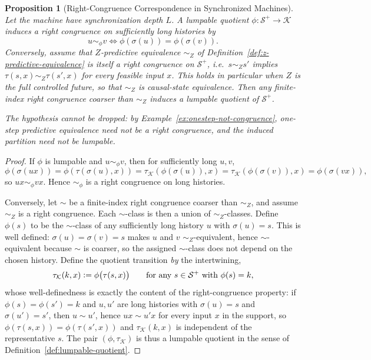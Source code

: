 \documentclass[12pt]{article}
\newtheorem{proposition}[theorem]{Proposition}
\theoremstyle{definition}
\newcommand{\eqdef}{\vcentcolon=}
\newcommand{\Splus}{\mathcal S^{+}}
\begin{document}
\begin{proposition}[Right-Congruence Correspondence in Synchronized Machines]
\label{prop:lumpability}
Let the machine have synchronization depth $L$.  A lumpable quotient
$\phi:\Splus\to\mathcal K$ induces a right congruence on sufficiently long
histories by
\[
u\sim_\phi v
\iff
\phi(\sigma(u))=\phi(\sigma(v)).
\]
Conversely, assume that $Z$-predictive equivalence $\sim_Z$ of
Definition~\ref{def:z-predictive-equivalence} is itself a right congruence on
$\Splus$, i.e.\ $s\sim_Zs'$ implies $\tau(s,x)\sim_Z\tau(s',x)$ for every
feasible input $x$.  This holds in particular when $Z$ is the full controlled
future, so that $\sim_Z$ is causal-state equivalence.  Then any finite-index
right congruence coarser than $\sim_Z$ induces a lumpable quotient of
$\Splus$.

The hypothesis cannot be dropped: by Example~\ref{ex:onestep-not-congruence},
one-step predictive equivalence need not be a right congruence, and the
induced partition need not be lumpable.
\end{proposition}

\begin{proof}
If $\phi$ is lumpable and $u\sim_\phi v$, then for sufficiently long $u,v$,
\[
\phi(\sigma(ux))
=
\phi(\tau(\sigma(u),x))
=
\tau_{\mathcal K}(\phi(\sigma(u)),x)
=
\tau_{\mathcal K}(\phi(\sigma(v)),x)
=
\phi(\sigma(vx)),
\]
so $ux\sim_\phi vx$.  Hence $\sim_\phi$ is a right congruence on long
histories.

Conversely, let $\sim$ be a finite-index right congruence coarser than
$\sim_Z$, and assume $\sim_Z$ is a right congruence.  Each $\sim$-class is
then a union of $\sim_Z$-classes.  Define $\phi(s)$ to be the $\sim$-class of
any sufficiently long history $u$ with $\sigma(u)=s$.  This is well defined:
$\sigma(u)=\sigma(v)=s$ makes $u$ and $v$ $\sim_Z$-equivalent, hence
$\sim$-equivalent because $\sim$ is coarser, so the assigned $\sim$-class does
not depend on the chosen history.  Define the quotient transition \emph{by}
the intertwining,
\[
\tau_{\mathcal K}(k,x)\eqdef\phi\bigl(\tau(s,x)\bigr)
\qquad\text{for any }s\in\Splus\text{ with }\phi(s)=k,
\]
whose well-definedness is exactly the content of the right-congruence
property: if $\phi(s)=\phi(s')=k$ and $u,u'$ are long histories with
$\sigma(u)=s$ and $\sigma(u')=s'$, then $u\sim u'$, hence $ux\sim u'x$ for
every input $x$ in the support, so $\phi(\tau(s,x))=\phi(\tau(s',x))$ and
$\tau_{\mathcal K}(k,x)$ is independent of the representative $s$.  The pair
$(\phi,\tau_{\mathcal K})$ is thus a lumpable quotient in the sense of
Definition~\ref{def:lumpable-quotient}.
\end{proof}
\end{document}
